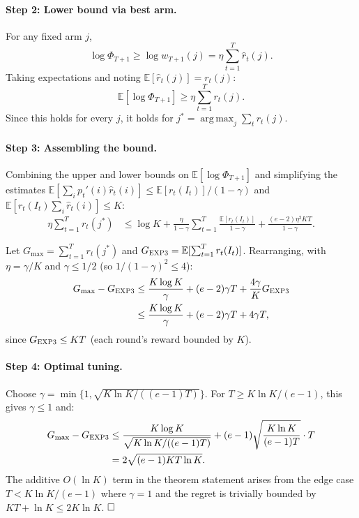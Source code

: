 \documentclass[conference]{IEEEtran}
\DeclareMathOperator*{\argmax}{arg\,max}
\begin{document}
\paragraph{Step 2: Lower bound via best arm.}
For any fixed arm $j$,
\[
  \log\Phi_{T+1}
  \ge \log w_{T+1}(j)
  = \eta\sum_{t=1}^{T} \hat{r}_t(j).
\]
Taking expectations and noting
$\mathbb{E}[\hat{r}_t(j)] = r_t(j)$:
\[
  \mathbb{E}[\log\Phi_{T+1}]
  \ge \eta\sum_{t=1}^{T} r_t(j).
\]
Since this holds for every $j$, it holds for
$j^* = \argmax_j \sum_t r_t(j)$.

\paragraph{Step 3: Assembling the bound.}
Combining the upper and lower bounds on $\mathbb{E}[\log\Phi_{T+1}]$
and simplifying the estimates
$\mathbb{E}[\sum_i p_t'(i)\hat{r}_t(i)] \le \mathbb{E}[r_t(I_t)]/(1-\gamma)$
and
$\mathbb{E}[r_t(I_t)\sum_i \hat{r}_t(i)] \le K$:
\begin{align}
  \eta\sum_{t=1}^{T} r_t(j^*)
  &\le \log K
     + \frac{\eta}{1-\gamma} \sum_{t=1}^{T}
       \frac{\mathbb{E}[r_t(I_t)]}{1-\gamma}
     + \frac{(e-2)\eta^2 K T}{1-\gamma}.
\end{align}

Let $G_{\max} = \sum_{t=1}^{T} r_t(j^*)$ and
$G_{\textsc{EXP3}} = \mathbb{E}[\sum_{t=1}^{T} r_t(I_t)]$.
Rearranging, with $\eta = \gamma/K$ and $\gamma \le 1/2$ (so
$1/(1-\gamma)^2 \le 4$):
\begin{align}
  G_{\max} - G_{\textsc{EXP3}}
  &\le \frac{K\log K}{\gamma}
     + (e-2)\gamma T
     + \frac{4\gamma}{K} G_{\textsc{EXP3}} \nonumber \\
  &\le \frac{K\log K}{\gamma}
     + (e-2)\gamma T + 4\gamma T,
  \label{eq:exp3-bound-intermediate}
\end{align}
since $G_{\textsc{EXP3}} \le KT$ (each round's reward bounded by $K$).

\paragraph{Step 4: Optimal tuning.}
Choose $\gamma = \min\{1, \sqrt{K\ln K / ((e-1)T)}\}$.
For $T \ge K\ln K/(e-1)$, this gives $\gamma \le 1$ and:
\begin{align}
  G_{\max} - G_{\textsc{EXP3}}
  &\le \frac{K\log K}{\sqrt{K\ln K/((e-1)T)}}
     + (e-1)\sqrt{\frac{K\ln K}{(e-1)T}} \cdot T \nonumber \\
  &= 2\sqrt{(e-1)KT\ln K}.
\end{align}
The additive $O(\ln K)$ term in the theorem statement arises from
the edge case $T < K\ln K/(e-1)$ where $\gamma=1$ and the regret is
trivially bounded by $KT + \ln K \le 2K\ln K$.  $\hfill\square$
\end{document}
